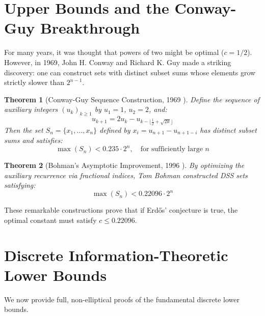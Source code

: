 \documentclass[11pt,a4paper]{article}
\newtheorem{theorem}{Theorem}[section]
\theoremstyle{definition}
\begin{document}
\section{Upper Bounds and the Conway-Guy Breakthrough}

For many years, it was thought that powers of two might be optimal ($c = 1/2$). However, in 1969, John H. Conway and Richard K. Guy \cite{conway1969} made a striking discovery: one can construct sets with distinct subset sums whose elements grow strictly slower than $2^{n-1}$.

\begin{theorem}[Conway-Guy Sequence Construction, 1969 \cite{conway1969}]\label{thm:conway_guy}
Define the sequence of auxiliary integers $(u_k)_{k \ge 1}$ by $u_1 = 1$, $u_2 = 2$, and:
\begin{equation}\label{eq:cg_rec}
u_{k+1} = 2 u_k - u_{k - \lfloor \frac{1}{2} + \sqrt{2k} \rfloor}
\end{equation}
Then the set $S_{n} = \{x_1, \dots, x_n\}$ defined by $x_i = u_{n+1} - u_{n+1-i}$ has distinct subset sums and satisfies:
\begin{equation}\label{eq:cg_bound}
\max(S_n) < 0.235 \cdot 2^n, \quad \text{for sufficiently large } n
\end{equation}
\end{theorem}

\begin{theorem}[Bohman's Asymptotic Improvement, 1996 \cite{bohman1996}]\label{thm:bohman}
By optimizing the auxiliary recurrence via fractional indices, Tom Bohman constructed DSS sets satisfying:
\begin{equation}\label{eq:bohman_bound}
\max(S_n) < 0.22096 \cdot 2^n
\end{equation}
\end{theorem}

These remarkable constructions prove that if Erd\H{o}s' conjecture is true, the optimal constant must satisfy $c \le 0.22096$.

\section{Discrete Information-Theoretic Lower Bounds}

We now provide full, non-elliptical proofs of the fundamental discrete lower bounds.
\end{document}

